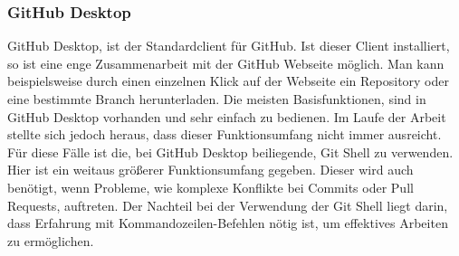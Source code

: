\documentclass[FIPLY_base.tex]{subfiles}
\begin{document}
\subsubsection{GitHub Desktop}
GitHub Desktop, ist der Standardclient für GitHub.
Ist dieser Client installiert, so ist eine enge Zusammenarbeit mit der GitHub Webseite möglich.
Man kann beispielsweise durch einen einzelnen Klick auf der Webseite ein Repository oder eine bestimmte Branch herunterladen.
Die meisten Basisfunktionen, sind in GitHub Desktop vorhanden und sehr einfach zu bedienen.
Im Laufe der Arbeit stellte sich jedoch heraus, dass dieser Funktionsumfang nicht immer ausreicht.
Für diese Fälle ist die, bei GitHub Desktop beiliegende, Git Shell zu verwenden.
Hier ist ein weitaus größerer Funktionsumfang gegeben.
Dieser wird auch benötigt, wenn Probleme, wie komplexe Konflikte bei Commits oder Pull Requests, auftreten.
Der Nachteil bei der Verwendung der Git Shell liegt darin, dass Erfahrung mit Kommandozeilen-Befehlen nötig ist, um effektives Arbeiten zu ermöglichen.
\end{document}
